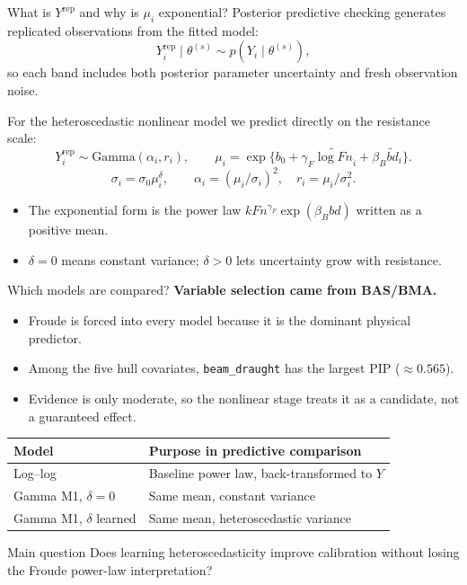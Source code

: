\documentclass[11pt,aspectratio=169]{beamer}
\newcommand{\Fn}{\ensuremath{F\!n}}
\begin{document}
\begin{frame}{What is $Y^{\mathrm{rep}}$ and why is $\mu_i$ exponential?}
	\small
	Posterior predictive checking generates replicated observations from the fitted model:
	\[
		Y_i^{\mathrm{rep}}\mid\theta^{(s)} \sim p(Y_i\mid\theta^{(s)}),
	\]
	so each band includes both posterior parameter uncertainty and fresh observation noise.
	\vspace{0.4em}

	For the heteroscedastic nonlinear model we predict directly on the resistance scale:
	\[
		Y_i^{\mathrm{rep}}\sim\mathrm{Gamma}(\alpha_i,r_i),
		\qquad
		\mu_i=\exp\{b_0+\gamma_F\widetilde{\log \Fn}_i+
		\beta_B\widetilde{bd}_i\}.
	\]
	\[
		\sigma_i=\sigma_0\mu_i^{\delta},
		\qquad
		\alpha_i=(\mu_i/\sigma_i)^2,
		\quad r_i=\mu_i/\sigma_i^2.
	\]
	\begin{itemize}
		\item The exponential form is the power law $k\Fn^{\gamma_F}\exp(\beta_B bd)$ written as a positive mean.
		\item $\delta=0$ means constant variance; $\delta>0$ lets uncertainty grow with resistance.
	\end{itemize}
\end{frame}

\begin{frame}{Which models are compared?}
	\small
	\textbf{Variable selection came from BAS/BMA.}
	\begin{itemize}
		\item Froude is forced into every model because it is the dominant physical predictor.
		\item Among the five hull covariates, \texttt{beam\_draught} has the largest PIP ($\approx0.565$).
		\item Evidence is only moderate, so the nonlinear stage treats it as a candidate, not a guaranteed effect.
	\end{itemize}
	\vspace{0.3em}
	\begin{center}
		\begin{tabular}{ll}
			\toprule
			\textbf{Model} & \textbf{Purpose in predictive comparison} \\
			\midrule
			Log--log & Baseline power law, back-transformed to $Y$ \\
			Gamma M1, $\delta=0$ & Same mean, constant variance \\
			Gamma M1, $\delta$ learned & Same mean, heteroscedastic variance \\
			\bottomrule
		\end{tabular}
	\end{center}
	\begin{block}{Main question}
		Does learning heteroscedasticity improve calibration without losing the Froude power-law interpretation?
	\end{block}
\end{frame}
\end{document}

